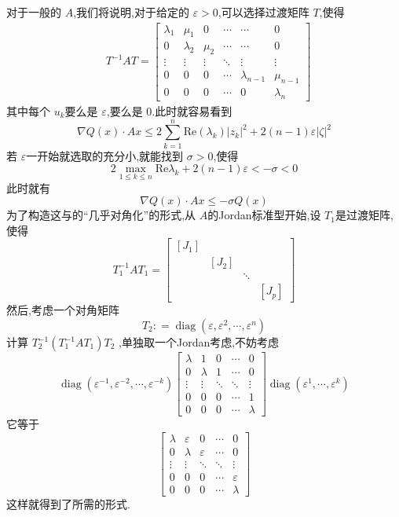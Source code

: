 \documentclass[lang=cn,12pt,color=green,fontset=none]{elegantbook}
\begin{document}
对于一般的 $ A $,我们将说明,对于给定的 $  \varepsilon >0 $,可以选择过渡矩阵 $ T $,使得 $$
\begin{aligned}&T^{-1}AT=\begin{bmatrix}\lambda_1&\mu_1&0&\cdots&\cdots&0\\0&\lambda_2&\mu_2&\cdots&\cdots&0\\\vdots&\vdots&\vdots&\ddots&\vdots&\vdots\\0&0&0&\cdots&\lambda_{n-1}&\mu_{n-1}\\0&0&0&\cdots&0&\lambda_n\end{bmatrix}\end{aligned}
$$  其中每个 $ u_{k} $要么是 $  \varepsilon  $,要么是 $ 0 $.此时就容易看到 $$
\nabla Q\left( x \right)\cdot Ax \le  2 \sum _{k=1}^{n} \mathrm{Re}\left(  \lambda _{k} \right)\left| z_{k} \right|^{2}+  2\left( n-1 \right) \varepsilon  \left| \zeta \right|^{2}     
$$   若 $  \varepsilon  $一开始就选取的充分小,就能找到 $ \sigma >0 $,使得 $$
2 \max _{1\le k\le n} \mathrm{Re} \lambda _{k}+  2\left( n-1 \right)  \varepsilon <-\sigma <0
$$  此时就有 $$
\nabla Q\left( x \right)\cdot Ax \le  -\sigma  Q\left( x \right)  
$$
为了构造这与的“几乎对角化”的形式,从 $ A $的Jordan标准型开始,设 $ T_1 $是过渡矩阵,使得 $$
T_1^{-1} AT_1= \begin{bmatrix} 
    [J_1]& & & \\ 
     
    & [J_{2}]& &\\ 
     & &  \ddots & \\ 
      
    & & & [J_{p}] 
\end{bmatrix} 
$$  然后,考虑一个对角矩阵 $$
T_2: = \operatorname{diag}\left(  \varepsilon , \varepsilon ^{2},\cdots , \varepsilon ^{n} \right) 
$$计算 $ T_2^{-1} \left( T_1^{-1} AT_1 \right)T_2  $ ,单独取一个Jordan考虑,不妨考虑 $$
\operatorname{diag}\left(  \varepsilon ^{-1} , \varepsilon ^{-2},\cdots , \varepsilon ^{-k} \right) \begin{bmatrix}\lambda&1&0&\cdots&0\\0&\lambda&1&\cdots&0\\\vdots&\vdots&\ddots&\ddots&\vdots\\0&0&0&\cdots&1\\0&0&0&\cdots&\lambda\end{bmatrix}
\operatorname{diag}\left(  \varepsilon ^{1},\cdots , \varepsilon ^{k} \right) 
$$它等于 $$ 
    \begin{bmatrix}\lambda & \varepsilon & 0 & \cdots & 0\\ 0 & \lambda & \varepsilon & \cdots & 0\\ \vdots & \vdots & \ddots & \ddots & \vdots\\ 0 & 0 & 0 & \cdots & \varepsilon\\ 0 & 0 & 0 & \cdots & \lambda\end{bmatrix} 
$$      这样就得到了所需的形式.
\end{document}
